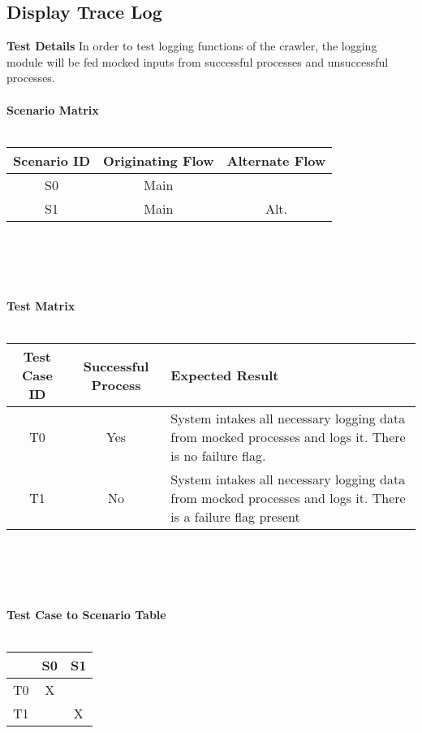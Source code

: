 \subsection{Display Trace Log}
\textbf{Test Details}
In order to test logging functions of the crawler, the logging module will be fed mocked inputs from successful processes and unsuccessful processes.\\\\
\textbf{Scenario Matrix}\\\\
\begin{tabular}{|c|c c|}
	\hline
	Scenario ID & Originating Flow & Alternate Flow  \\ \hline \hline
	S0 & Main &  \\ \hline
	S1 & Main & Alt. \\ \hline
\end{tabular}\\\\\\\\
\textbf{Test Matrix}\\\\
\begin{tabularx}{\textwidth}{|c c X|}
	\hline
	\textbf{Test Case ID} & \bf{Successful Process} & \textbf{Expected Result}  \\ \hline
	T0 & Yes & System intakes all necessary logging data from mocked processes and logs it.  There is no failure flag. \\ \hline
	T1 & No & System intakes all necessary logging data from mocked processes and logs it.  There is a failure flag present \\ \hline
\end{tabularx}\\\\\\\\
\textbf{Test Case to Scenario Table}\\\\
\begin{tabular}{|r||c|c|}
	\hline
	& S0 & S1 \\ \hline \hline
	T0 & X & \\ \hline
	T1 & & X \\ \hline
\end{tabular}

